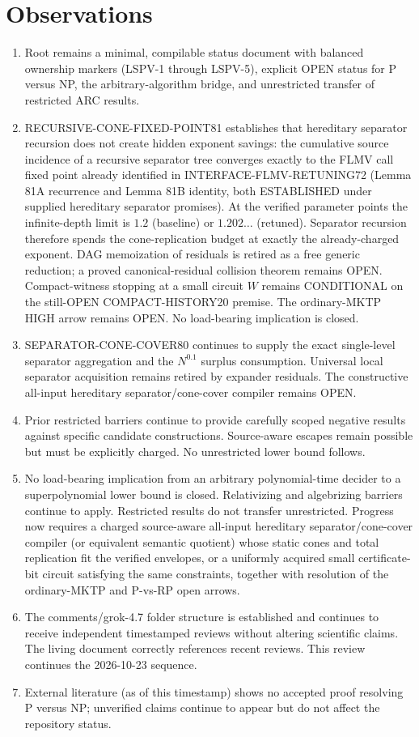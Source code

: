 \documentclass[11pt]{article}
\begin{document}
\section{Observations}
\begin{enumerate}
\item Root  remains a minimal, compilable status document with balanced ownership markers (LSPV-1 through LSPV-5), explicit OPEN status for P versus NP, the arbitrary-algorithm bridge, and unrestricted transfer of restricted ARC results.
\item RECURSIVE-CONE-FIXED-POINT81 establishes that hereditary separator recursion does not create hidden exponent savings: the cumulative source incidence of a recursive separator tree converges exactly to the FLMV call fixed point already identified in INTERFACE-FLMV-RETUNING72 (Lemma 81A recurrence and Lemma 81B identity, both ESTABLISHED under supplied hereditary separator promises). At the verified parameter points the infinite-depth limit is $1.2$ (baseline) or $1.202\ldots$ (retuned). Separator recursion therefore spends the cone-replication budget at exactly the already-charged exponent. DAG memoization of residuals is retired as a free generic reduction; a proved canonical-residual collision theorem remains OPEN. Compact-witness stopping at a small circuit $W$ remains CONDITIONAL on the still-OPEN COMPACT-HISTORY20 premise. The ordinary-MKTP HIGH arrow remains OPEN. No load-bearing implication is closed.
\item SEPARATOR-CONE-COVER80 continues to supply the exact single-level separator aggregation and the $N^{0.1}$ surplus consumption. Universal local separator acquisition remains retired by expander residuals. The constructive all-input hereditary separator/cone-cover compiler remains OPEN.
\item Prior restricted barriers continue to provide carefully scoped negative results against specific candidate constructions. Source-aware escapes remain possible but must be explicitly charged. No unrestricted lower bound follows.
\item No load-bearing implication from an arbitrary polynomial-time decider to a superpolynomial lower bound is closed. Relativizing and algebrizing barriers continue to apply. Restricted results do not transfer unrestricted. Progress now requires a charged source-aware all-input hereditary separator/cone-cover compiler (or equivalent semantic quotient) whose static cones and total replication fit the verified envelopes, or a uniformly acquired small certificate-bit circuit satisfying the same constraints, together with resolution of the ordinary-MKTP and P-vs-RP open arrows.
\item The comments/grok-4.7 folder structure is established and continues to receive independent timestamped reviews without altering scientific claims. The living document correctly references recent reviews. This review continues the 2026-10-23 sequence.
\item External literature (as of this timestamp) shows no accepted proof resolving P versus NP; unverified claims continue to appear but do not affect the repository status.
\end{enumerate}
\end{document}
